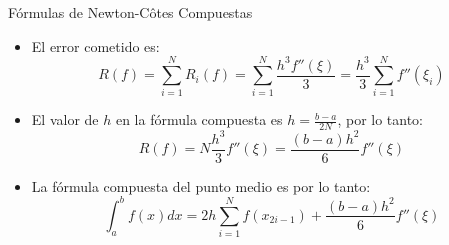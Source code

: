 \documentclass[12pt]{beamer}
\begin{document}
\begin{frame}{F\'ormulas de Newton-C\^otes Compuestas}
  \begin{itemize}
    \item El error cometido es:
    $$
    R(f) = \sum_{i=1}^{N}R_i(f) = \sum_{i=1}^{N}\dfrac{h^3f''(\xi)}{3} = \dfrac{h^3}{3}\sum_{i=1}^{N}f''(\xi_i)
    $$
    \item<2-> El valor de $h$ en la f\'ormula compuesta es $h=\frac{b-a}{2N}$, por lo tanto:
    $$
    R(f) = N \dfrac{h^3}{3}f''(\xi) = \dfrac{(b-a)h^2}{6}f''(\xi)
    $$
    \item<3-> La f\'ormula compuesta del punto medio es por lo tanto:
    $$
    \int_{a}^{b}f(x)dx = 2h\sum_{i=1}^{N}f(x_{2i-1})+ \dfrac{(b-a)h^2}{6}f''(\xi)
    $$
  \end{itemize}
\end{frame}
\end{document}
